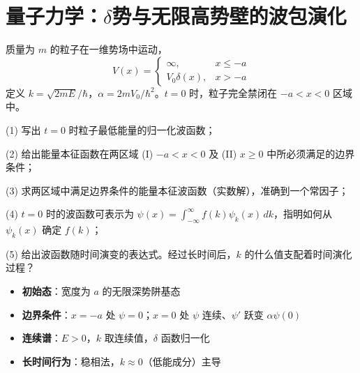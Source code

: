 \section{量子力学：$\delta$势与无限高势壁的波包演化}
\label{sec:delta-wall-evolution}

\begin{modelbox}
质量为 $m$ 的粒子在一维势场中运动，
\[
V(x)=\begin{cases}\infty,&x\leq-a\\V_0\delta(x),&x>-a\end{cases}
\]
定义 $k=\sqrt{2mE}/\hbar$，$\alpha=2mV_0/\hbar^2$。$t=0$ 时，粒子完全禁闭在 $-a<x<0$ 区域中。

(1) 写出 $t=0$ 时粒子最低能量的归一化波函数；

(2) 给出能量本征函数在两区域 (I) $-a<x<0$ 及 (II) $x\geq0$ 中所必须满足的边界条件；

(3) 求两区域中满足边界条件的能量本征波函数（实数解），准确到一个常因子；

(4) $t=0$ 时的波函数可表示为 $\psi(x)=\int_{-\infty}^{\infty}f(k)\psi_k(x)\,dk$，指明如何从 $\psi_k(x)$ 确定 $f(k)$；

(5) 给出波函数随时间演变的表达式。经过长时间后，$k$ 的什么值支配着时间演化过程？
\end{modelbox}

\begin{tipbox}[考点快速分析]
\begin{itemize}
    \item \textbf{初始态}：宽度为 $a$ 的无限深势阱基态
    \item \textbf{边界条件}：$x=-a$ 处 $\psi=0$；$x=0$ 处 $\psi$ 连续、$\psi'$ 跃变 $\alpha\psi(0)$
    \item \textbf{连续谱}：$E>0$，$k$ 取连续值，$\delta$ 函数归一化
    \item \textbf{长时间行为}：稳相法，$k\approx0$（低能成分）主导
\end{itemize}
\end{tipbox}

